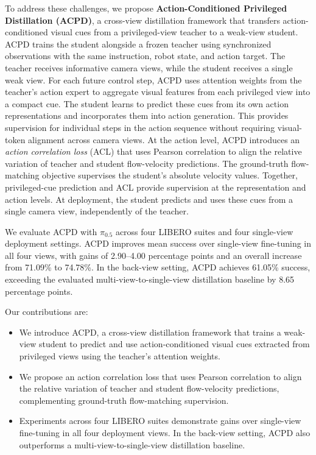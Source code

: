 To address these challenges, we propose \textbf{Action-Conditioned Privileged Distillation (ACPD)}, a cross-view distillation framework that transfers action-conditioned visual cues from a privileged-view teacher to a weak-view student.
ACPD trains the student alongside a frozen teacher using synchronized observations with the same instruction, robot state, and action target. The teacher receives informative camera views, while the student receives a single weak view. For each future control step, ACPD uses attention weights from the teacher's action expert to aggregate visual features from each privileged view into a compact cue. The student learns to predict these cues from its own action representations and incorporates them into action generation. This provides supervision for individual steps in the action sequence without requiring visual-token alignment across camera views.
At the action level, ACPD introduces an \textit{action correlation loss} (ACL) that uses Pearson correlation to align the relative variation of teacher and student flow-velocity predictions. The ground-truth flow-matching objective supervises the student's absolute velocity values. Together, privileged-cue prediction and ACL provide supervision at the representation and action levels. At deployment, the student predicts and uses these cues from a single camera view, independently of the teacher.

We evaluate ACPD with $\pi_{0.5}$ across four LIBERO suites and four single-view deployment settings. ACPD improves mean success over single-view fine-tuning in all four views, with gains of 2.90--4.00 percentage points and an overall increase from 71.09\% to 74.78\%. In the back-view setting, ACPD achieves 61.05\% success, exceeding the evaluated multi-view-to-single-view distillation baseline by 8.65 percentage points.


Our contributions are:
\begin{itemize}
    \item We introduce ACPD, a cross-view distillation framework that trains a weak-view student to predict and use action-conditioned visual cues extracted from privileged views using the teacher's attention weights.
    \item We propose an action correlation loss that uses Pearson correlation to align the relative variation of teacher and student flow-velocity predictions, complementing ground-truth flow-matching supervision.
    \item Experiments across four LIBERO suites demonstrate gains over single-view fine-tuning in all four deployment views. In the back-view setting, ACPD also outperforms a multi-view-to-single-view distillation baseline.
\end{itemize}

